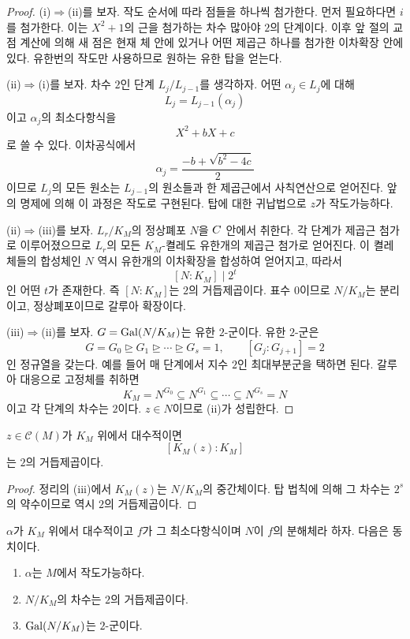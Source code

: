 \begin{proof}
(i)$\Rightarrow$(ii)를 보자. 작도 순서에 따라 점들을 하나씩 첨가한다. 먼저 필요하다면 $i$를 첨가한다. 이는 $X^2+1$의 근을 첨가하는 차수 많아야 $2$의 단계이다. 이후 앞 절의 교점 계산에 의해 새 점은 현재 체 안에 있거나 어떤 제곱근 하나를 첨가한 이차확장 안에 있다. 유한번의 작도만 사용하므로 원하는 유한 탑을 얻는다.

(ii)$\Rightarrow$(i)를 보자. 차수 $2$인 단계 $L_j/L_{j-1}$를 생각하자. 어떤 $\alpha_j\in L_j$에 대해
\[
  L_j=L_{j-1}(\alpha_j)
\]
이고 $\alpha_j$의 최소다항식을
\[
  X^2+bX+c
\]
로 쓸 수 있다. 이차공식에서
\[
  \alpha_j=\frac{-b+\sqrt{b^2-4c}}2
\]
이므로 $L_j$의 모든 원소는 $L_{j-1}$의 원소들과 한 제곱근에서 사칙연산으로 얻어진다. 앞의 명제에 의해 이 과정은 작도로 구현된다. 탑에 대한 귀납법으로 $z$가 작도가능하다.

(ii)$\Rightarrow$(iii)를 보자. $L_r/K_M$의 정상폐포 $N$을 $C$ 안에서 취한다. 각 단계가 제곱근 첨가로 이루어졌으므로 $L_r$의 모든 $K_M$-켤레도 유한개의 제곱근 첨가로 얻어진다. 이 켤레체들의 합성체인 $N$ 역시 유한개의 이차확장을 합성하여 얻어지고, 따라서
\[
  [N:K_M]\mid 2^t
\]
인 어떤 $t$가 존재한다. 즉 $[N:K_M]$는 $2$의 거듭제곱이다. 표수 $0$이므로 $N/K_M$는 분리이고, 정상폐포이므로 갈루아 확장이다.

(iii)$\Rightarrow$(ii)를 보자. $G=\operatorname{Gal}(N/K_M)$는 유한 $2$-군이다. 유한 $2$-군은
\[
  G=G_0\trianglerighteq G_1\trianglerighteq\cdots\trianglerighteq G_s=1,
  \qquad [G_j:G_{j+1}]=2
\]
인 정규열을 갖는다. 예를 들어 매 단계에서 지수 $2$인 최대부분군을 택하면 된다. 갈루아 대응으로 고정체를 취하면
\[
  K_M=N^{G_0}\subseteq N^{G_1}\subseteq\cdots\subseteq N^{G_s}=N
\]
이고 각 단계의 차수는 $2$이다. $z\in N$이므로 (ii)가 성립한다.
\end{proof}

\begin{corollary}
\label{cor:constructible-degree-power-two}
$z\in\mathcal C(M)$가 $K_M$ 위에서 대수적이면
\[
  [K_M(z):K_M]
\]
는 $2$의 거듭제곱이다.
\end{corollary}

\begin{proof}
정리의 (iii)에서 $K_M(z)$는 $N/K_M$의 중간체이다. 탑 법칙에 의해 그 차수는 $2^s$의 약수이므로 역시 $2$의 거듭제곱이다.
\end{proof}

\begin{corollary}
\label{cor:constructible-splitting-field-two-group}
$\alpha$가 $K_M$ 위에서 대수적이고 $f$가 그 최소다항식이며 $N$이 $f$의 분해체라 하자. 다음은 동치이다.
\begin{enumerate}[label=(\roman*)]
  \item $\alpha$는 $M$에서 작도가능하다.
  \item $N/K_M$의 차수는 $2$의 거듭제곱이다.
  \item $\operatorname{Gal}(N/K_M)$는 $2$-군이다.
\end{enumerate}
\end{corollary}

